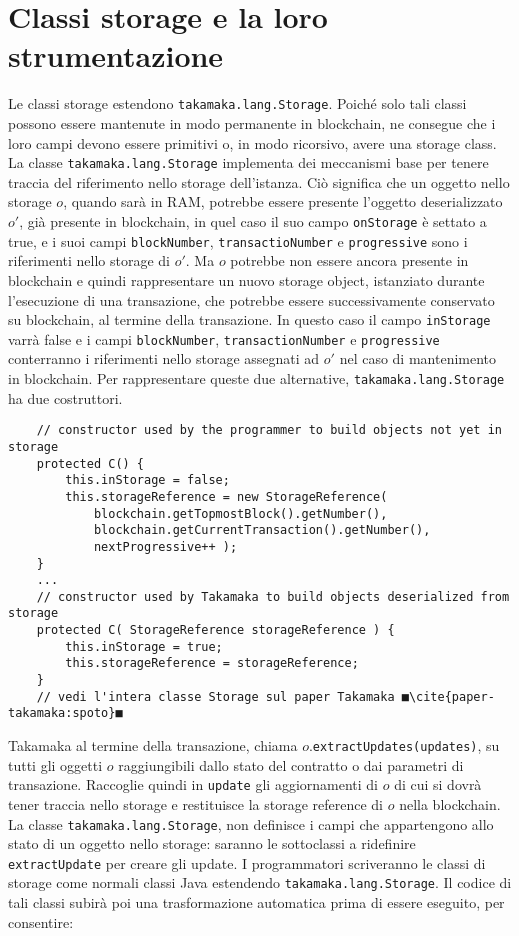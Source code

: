 \section{Classi storage e la loro strumentazione}
Le classi storage estendono \lstinline|takamaka.lang.Storage|. Poiché solo tali classi possono essere mantenute in modo permanente in blockchain, ne consegue che i loro campi devono essere primitivi o, in modo ricorsivo, avere una storage class. La classe \lstinline|takamaka.lang.Storage| implementa dei meccanismi base per tenere traccia del riferimento nello storage dell'istanza. Ciò significa che un oggetto nello storage $o$, quando sarà in RAM, potrebbe essere presente l'oggetto deserializzato $o'$, già presente in blockchain, in quel caso il suo campo \lstinline|onStorage| è settato a true, e i suoi campi \lstinline|blockNumber|, \lstinline|transactioNumber| e \lstinline|progressive| sono i riferimenti nello storage di $o'$. Ma $o$ potrebbe non essere ancora presente in blockchain e quindi rappresentare un nuovo storage object, istanziato durante l'esecuzione di una transazione, che potrebbe essere successivamente conservato su blockchain, al termine della transazione. In questo caso il campo \lstinline|inStorage| varrà false e i campi \lstinline|blockNumber|, \lstinline|transactionNumber| e \lstinline|progressive| conterranno i riferimenti nello storage assegnati ad $o'$ nel caso di mantenimento in blockchain. Per rappresentare queste due alternative, \lstinline|takamaka.lang.Storage| ha due costruttori.
%
\begin{lstlisting}
	// constructor used by the programmer to build objects not yet in storage
	protected C() {
		this.inStorage = false;
		this.storageReference = new StorageReference(
			blockchain.getTopmostBlock().getNumber(),
			blockchain.getCurrentTransaction().getNumber(),
			nextProgressive++ );
	}
	...
	// constructor used by Takamaka to build objects deserialized from storage
	protected C( StorageReference storageReference ) {
		this.inStorage = true;
		this.storageReference = storageReference;
	}
	// vedi l'intera classe Storage sul paper Takamaka ■\cite{paper-takamaka:spoto}■
\end{lstlisting}
%
Takamaka al termine della transazione, chiama $o$.\lstinline|extractUpdates(updates)|, su tutti gli oggetti $o$ raggiungibili dallo stato del contratto o dai parametri di transazione. Raccoglie quindi in \lstinline|update| gli aggiornamenti di $o$ di cui si dovrà tener traccia nello storage e restituisce la storage reference di $o$ nella blockchain. La classe \lstinline|takamaka.lang.Storage|, non definisce i campi che appartengono allo stato di un oggetto nello storage: saranno le sottoclassi a ridefinire \lstinline|extractUpdate| per creare gli update. I programmatori scriveranno le classi di storage come normali classi Java estendendo \lstinline|takamaka.lang.Storage|. Il codice di tali classi subirà poi una trasformazione automatica prima di essere eseguito, per consentire:
